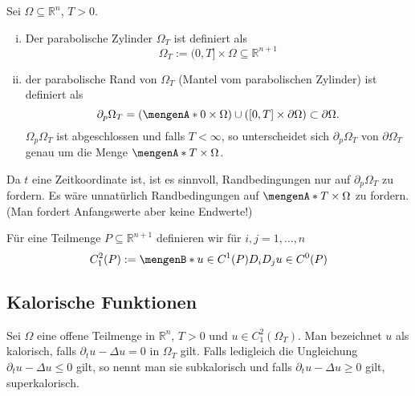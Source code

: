 \begin{definition}
	Sei $\Omega \subseteq \mathbb{R}^n$, $T >0$.
	\begin{enumerate}[(i)]
		\item Der parabolische Zylinder $\Omega_T$ ist definiert als
		\[
			\Omega_T := (0,T] \times \Omega \subseteq \mathbb{R}^{n+1}
		\]
		\item der parabolische Rand von $\Omega_T$ (Mantel vom parabolischen Zylinder) ist definiert als
		\[
			\partial_p \Omega_T = ( \set{0} \times \Omega) \cup ( [0,T] \times \partial \Omega) \subset \partial \Omega .
		\]
		$\Omega_p \Omega_T$ ist abgeschlossen und falls $T < \infty$, 
		so unterscheidet sich $\partial_p \Omega_T$ von $\partial \Omega_T$ genau um die Menge $\set{T} \times \Omega$.
	\end{enumerate}
\end{definition}

\begin{bemerkung}
	Da $t$ eine Zeitkoordinate ist, ist es sinnvoll, Randbedingungen nur auf $\partial_p \Omega_T$ zu fordern. 
	Es wäre unnatürlich Randbedingungen auf $\set{T} \times \Omega$ zu fordern. (Man fordert Anfangswerte aber keine Endwerte!)
\end{bemerkung}
Für eine Teilmenge $P \subseteq \mathbb{R}^{n+1}$ definieren wir für $i,j=1,\dots,n$ 
\[
	C^2_1(P):= \set[u \in C^1(P)]{ D_iD_j u \in C^0(P)}
\]

\subsection{Kalorische Funktionen} 
\label{sub:kalorische_funktionen}

\begin{definition}
	Sei $\Omega$ eine offene Teilmenge in $\mathbb{R}^n$, $T >0$ und $u \in C^2_1(\Omega_T)$. Man bezeichnet $u$ als kalorisch, falls $\partial_t u - \Delta u =0$ in 
	$\Omega_T$ gilt. Falls ledigleich die Ungleichung $\partial_t u - \Delta u \leq 0$ gilt, so nennt man sie subkalorisch und falls $\partial_t u - \Delta u \geq 0$
	gilt, superkalorisch.
\end{definition}

